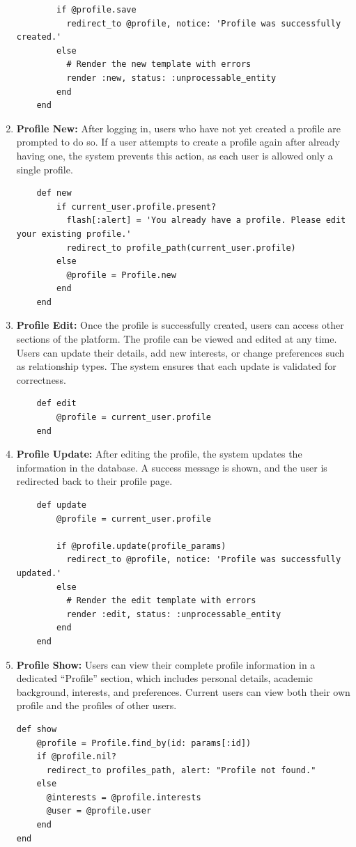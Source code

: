 \begin{enumerate}
\begin{lstlisting}
        if @profile.save
          redirect_to @profile, notice: 'Profile was successfully created.'
        else
          # Render the new template with errors
          render :new, status: :unprocessable_entity
        end
    end
    \end{lstlisting}

    \item \textbf{Profile New:}
    After logging in, users who have not yet created a profile are prompted to do so. If a user attempts to create a profile again after already having one, the system prevents this action, as each user is allowed only a single profile.
    \begin{lstlisting}
    def new
        if current_user.profile.present?
          flash[:alert] = 'You already have a profile. Please edit your existing profile.'
          redirect_to profile_path(current_user.profile)
        else
          @profile = Profile.new
        end
    end
    \end{lstlisting}

    \newpage
    \item \textbf{Profile Edit:} 
    Once the profile is successfully created, users can access other sections of the platform. The profile can be viewed and edited at any time. Users can update their details, add new interests, or change preferences such as relationship types. The system ensures that each update is validated for correctness.
    \begin{lstlisting}
    def edit
        @profile = current_user.profile
    end
    \end{lstlisting}

    \item \textbf{Profile Update:} 
    After editing the profile, the system updates the information in the database. A success message is shown, and the user is redirected back to their profile page.
    \begin{lstlisting}
    def update
        @profile = current_user.profile
      
        if @profile.update(profile_params)
          redirect_to @profile, notice: 'Profile was successfully updated.'
        else
          # Render the edit template with errors
          render :edit, status: :unprocessable_entity
        end
    end
    \end{lstlisting}

    \newpage
    \item \textbf{Profile Show:} 
    Users can view their complete profile information in a dedicated “Profile” section, which includes personal details, academic background, interests, and preferences. Current users can view both their own profile and the profiles of other users.
    \begin{lstlisting}
def show
    @profile = Profile.find_by(id: params[:id])
    if @profile.nil?
      redirect_to profiles_path, alert: "Profile not found."
    else
      @interests = @profile.interests
      @user = @profile.user
    end
end
    \end{lstlisting}


\end{enumerate}

